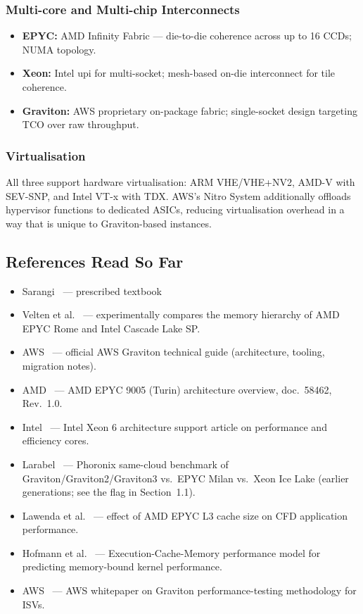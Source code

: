 \documentclass[12pt,a4paper]{article}
\begin{document}
\subsubsection*{Multi-core and Multi-chip Interconnects}
\begin{itemize}[leftmargin=*, itemsep=2pt]
  \item \textbf{EPYC:} AMD Infinity Fabric ---
        die-to-die coherence across up to 16 CCDs; NUMA topology.
  \item \textbf{Xeon:} Intel \gls{upi} for multi-socket;
        mesh-based on-die interconnect for tile coherence.
  \item \textbf{Graviton:} AWS proprietary on-package fabric;
        single-socket design targeting TCO over raw throughput.
\end{itemize}

\subsubsection*{Virtualisation}
All three support hardware virtualisation: ARM VHE/VHE+NV2, AMD-V with
SEV-SNP, and Intel VT-x with TDX. AWS's Nitro System additionally offloads hypervisor functions to dedicated ASICs,
reducing virtualisation overhead in a way that is unique to
Graviton-based instances.

\subsection{References Read So Far}
\begin{itemize}[leftmargin=*, itemsep=2pt]
\item Sarangi~\cite{sarangi} --- prescribed textbook
\item Velten et al.~\cite{velten2022} --- experimentally compares the
  memory hierarchy of AMD EPYC Rome and Intel Cascade Lake SP.
\item AWS~\cite{awsgravitonguide} --- official AWS Graviton technical
  guide (architecture, tooling, migration notes).
\item AMD~\cite{amdepyc} --- AMD EPYC 9005 (Turin) architecture
  overview, doc.\ 58462, Rev.\ 1.0.
\item Intel~\cite{intelxeon} --- Intel Xeon 6 architecture support
  article on performance and efficiency cores.
\item Larabel~\cite{phoronix2022} --- Phoronix same-cloud benchmark of
  Graviton/Graviton2/Graviton3 vs.\ EPYC Milan vs.\ Xeon Ice Lake
  (earlier generations; see the flag in Section~1.1).
\item Lawenda et al.~\cite{lawenda2025} --- effect of AMD EPYC L3
  cache size on CFD application performance.
\item Hofmann et al.~\cite{hofmann2015} --- Execution-Cache-Memory
  performance model for predicting memory-bound kernel performance.
\item AWS~\cite{awsperftesting} --- AWS whitepaper on Graviton
  performance-testing methodology for ISVs.
\end{itemize}
\end{document}
